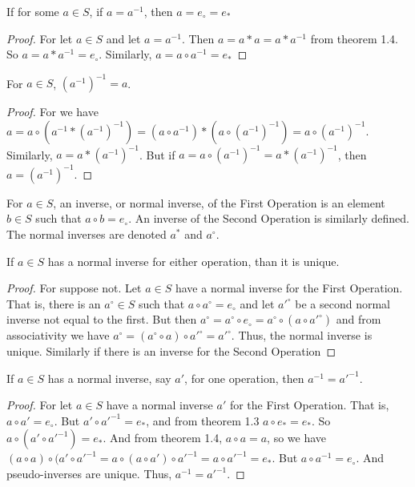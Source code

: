 \documentclass[crop=false,class=book,oneside]{standalone}
\begin{document}
            \begin{theorem} If for some $a\in S$, if $a=a^{-1}$, then $a=e_{\circ}=e_{*}$
            \end{theorem}
            \begin{proof} For let $a\in S$ and let $a=a^{-1}$. Then $a=a*a=a*a^{-1}$ from theorem 1.4. So $a=a*a^{-1}=e_{\circ}$. Similarly, $a=a\circ a^{-1} = e_{*}$
            \end{proof}
            \begin{theorem} For $a\in S$, $(a^{-1})^{-1} =a$.
            \end{theorem}
            \begin{proof} For we have $a = a\circ (a^{-1}* (a^{-1})^{-1}) = (a\circ a^{-1})*(a\circ (a^{-1})^{-1}) =a \circ (a^{-1})^{-1}$. Similarly, $a = a* (a^{-1})^{-1}$. But if $a = a\circ (a^{-1})^{-1} = a*(a^{-1})^{-1}$, then $a = (a^{-1})^{-1}$.
            \end{proof}
            \begin{definition} For $a\in S$, an inverse, or normal inverse, of the First Operation is an element $b\in S$ such that $a\circ b=e_{\circ}$. An inverse of the Second Operation is similarly defined. The normal inverses are denoted $a^{*}$ and $a^{\circ}$.
            \end{definition}
            \begin{theorem} If $a\in S$ has a normal inverse for either operation, than it is unique.
            \end{theorem}
            \begin{proof} For suppose not. Let $a\in S$ have a normal inverse for the First Operation. That is, there is an $a^{\circ}\in S$ such that $a\circ a^{\circ}=e_{\circ}$ and let $a'^{\circ}$ be a second normal inverse not equal to the first. But then $a^{\circ}=a^{\circ}\circ e_{\circ}=a^{\circ}\circ (a\circ a'^{\circ})$ and from associativity we have $a^{\circ}=(a^{\circ}\circ a)\circ a'^{\circ}=a'^{\circ}$. Thus, the normal inverse is unique. Similarly if there is an inverse for the Second Operation
            \end{proof}
            \begin{theorem} If $a\in S$ has a normal inverse, say $a'$, for one operation, then $a^{-1}=a'^{-1}$.
            \end{theorem}
            \begin{proof} For let $a\in S$ have a normal inverse $a'$ for the First Operation. That is, $a\circ a' = e_{\circ}$. But $a' \circ a'^{-1}=e_{*}$, and from theorem 1.3 $a\circ e_{*}=e_{*}$. So $a\circ (a' \circ a'^{-1})=e_{*}$. And from theorem 1.4, $a\circ a=a$, so we have $(a\circ a)\circ (a'\circ a'^{-1}=a\circ (a\circ a')\circ a'^{-1}=a\circ a'^{-1}=e_{*}$. But $a\circ a^{-1}=e_{\circ}$. And pseudo-inverses are unique. Thus, $a^{-1}=a'^{-1}$. 
            \end{proof}
\end{document}
